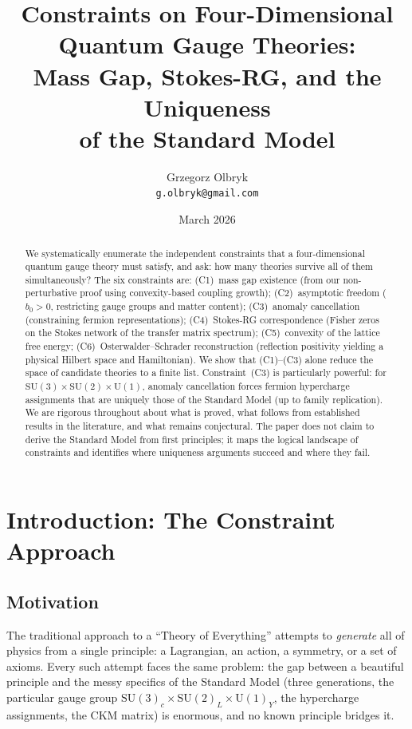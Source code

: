 \documentclass[12pt]{article}
\title{Constraints on Four-Dimensional Quantum Gauge Theories:\\[6pt]
\large Mass Gap, Stokes-RG, and the Uniqueness\\
of the Standard Model}
\author{Grzegorz Olbryk\\[-2pt]
\small\texttt{g.olbryk@gmail.com}}
\date{March 2026}
\theoremstyle{definition}
\theoremstyle{remark}
\newcommand{\SU}{\mathrm{SU}}
\newcommand{\UU}{\mathrm{U}}
\begin{document}
\maketitle

\begin{abstract}
We systematically enumerate the independent constraints that a
four-dimensional quantum gauge theory must satisfy, and ask:
how many theories survive all of them simultaneously?
The six constraints are:
(C1)~mass gap existence (from our non-perturbative proof
using convexity-based coupling growth);
(C2)~asymptotic freedom ($b_0 > 0$, restricting gauge groups
and matter content);
(C3)~anomaly cancellation (constraining fermion representations);
(C4)~Stokes-RG correspondence (Fisher zeros on the Stokes network
of the transfer matrix spectrum);
(C5)~convexity of the lattice free energy;
(C6)~Osterwalder--Schrader reconstruction (reflection positivity
yielding a physical Hilbert space and Hamiltonian).
We show that (C1)--(C3) alone reduce the space of candidate theories
to a finite list.  Constraint~(C3) is particularly powerful:
for $\SU(3) \times \SU(2) \times \UU(1)$, anomaly cancellation
forces fermion hypercharge assignments that are uniquely
those of the Standard Model (up to family replication).
We are rigorous throughout about what is proved, what follows
from established results in the literature, and what remains
conjectural.  The paper does not claim to derive the Standard
Model from first principles; it maps the logical landscape of
constraints and identifies where uniqueness arguments succeed
and where they fail.
\end{abstract}

\tableofcontents

\section{Introduction: The Constraint Approach}
\label{sec:intro}

\subsection{Motivation}

The traditional approach to a ``Theory of Everything'' attempts to
\emph{generate} all of physics from a single principle: a
Lagrangian, an action, a symmetry, or a set of axioms.  Every such
attempt faces the same problem: the gap between a beautiful
principle and the messy specifics of the Standard Model
(three generations, the particular gauge group
$\SU(3)_c \times \SU(2)_L \times \UU(1)_Y$, the hypercharge
assignments, the CKM matrix) is enormous, and no known principle
bridges it.
\end{document}
